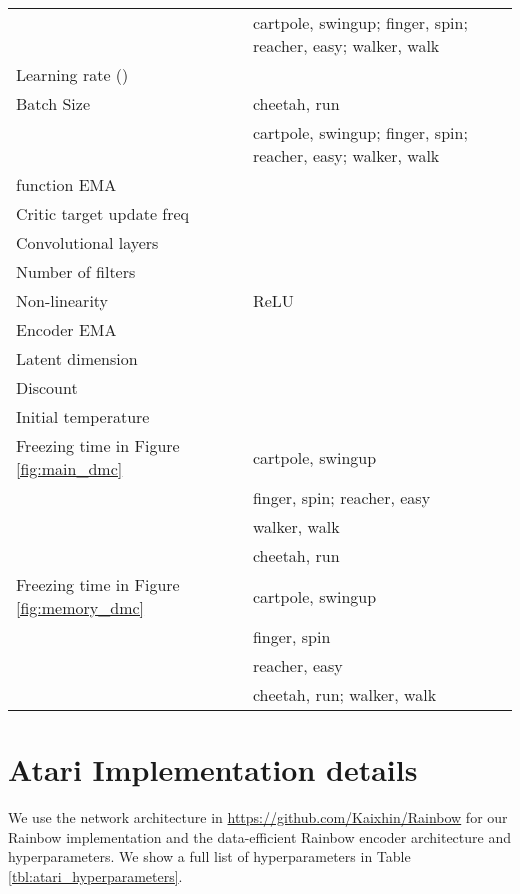 \documentclass{article}
\begin{document}
\begin{table*}[ht]
\begin{center}
\begin{small}
\begin{tabular}{ll}
&  cartpole, swingup; finger, spin; reacher, easy; walker, walk \\
Learning rate () &  \\
Batch Size    &  cheetah, run \\
&  cartpole, swingup; finger, spin; reacher, easy; walker, walk \\
 function EMA  &  \\
Critic target update freq &  \\
Convolutional layers &  \\
Number of filters &  \\
Non-linearity & ReLU \\
Encoder EMA  &  \\
Latent dimension &  \\
Discount  &  \\
Initial temperature &  \\
Freezing time  in Figure \ref{fig:main_dmc} 
 &  cartpole, swingup \\
 &  finger, spin; reacher, easy \\
 &  walker, walk  \\
 &  cheetah, run \\
Freezing time  in Figure \ref{fig:memory_dmc} 
 &  cartpole, swingup \\
 &  finger, spin \\
 &  reacher, easy  \\
 &  cheetah, run; walker, walk  \\
\bottomrule
\end{tabular}
\end{small}
\label{tbl:dmc_hyperparameters}
\end{center}
\vskip -0.1in
\end{table*} 

\section{Atari Implementation details} \label{appendix:atari_implementation_details}
We use the network architecture in \url{https://github.com/Kaixhin/Rainbow} for our Rainbow \citep{hessel2018rainbow} implementation and the data-efficient Rainbow \citep{van2019use} encoder architecture and hyperparameters. We show a full list of hyperparameters in Table \ref{tbl:atari_hyperparameters}. 
\end{document}
